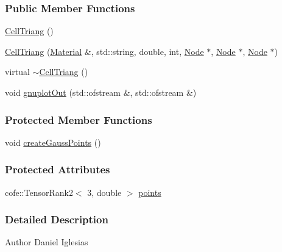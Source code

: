 \subsubsection*{Public Member Functions}
\begin{DoxyCompactItemize}
\item 
\hyperlink{classmknix_1_1_cell_triang_a17a2c3768e9f2aad3a7bfd8041775fb6}{Cell\-Triang} ()
\item 
\hyperlink{classmknix_1_1_cell_triang_a419492f1358e31432d6f686ee8ef1609}{Cell\-Triang} (\hyperlink{classmknix_1_1_material}{Material} \&, std\-::string, double, int, \hyperlink{classmknix_1_1_node}{Node} $\ast$, \hyperlink{classmknix_1_1_node}{Node} $\ast$, \hyperlink{classmknix_1_1_node}{Node} $\ast$)
\item 
virtual \hyperlink{classmknix_1_1_cell_triang_af0a12b3f4f6106291f3252716c4be025}{$\sim$\-Cell\-Triang} ()
\item 
void \hyperlink{classmknix_1_1_cell_triang_a374f66822e2e37d94a2cfe09c5173e8a}{gnuplot\-Out} (std\-::ofstream \&, std\-::ofstream \&)
\end{DoxyCompactItemize}
\subsubsection*{Protected Member Functions}
\begin{DoxyCompactItemize}
\item 
void \hyperlink{classmknix_1_1_cell_triang_a2a2c65fbd2682eba8225473a7dc841f0}{create\-Gauss\-Points} ()
\end{DoxyCompactItemize}
\subsubsection*{Protected Attributes}
\begin{DoxyCompactItemize}
\item 
cofe\-::\-Tensor\-Rank2$<$ 3, double $>$ \hyperlink{classmknix_1_1_cell_triang_a6f3e6ae0d06cbd4703c073e0860e38ed}{points}
\end{DoxyCompactItemize}


\subsubsection{Detailed Description}
\begin{DoxyAuthor}{Author}
Daniel Iglesias 
\end{DoxyAuthor}


